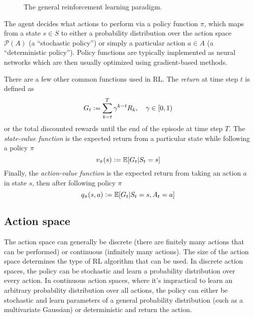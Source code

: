 \begin{figure}
    \centering
    \caption{The general reinforcement learning paradigm.}
    \label{fig:RL}
\end{figure}

The agent decides what actions to perform via a policy function $\pi$, which maps from a state $s \in S$ to either a probability distribution over the action space $\mathcal{P}(A)$ (a ``stochastic policy'') or simply a particular action $a \in A$ (a ``deterministic policy''). Policy functions are typically implemented as neural networks which are then usually optimized using gradient-based methods.

There are a few other common functions used in RL. The \emph{return} at time step $t$ is defined as
\begin{equation}\label{eq:return}
    G_t \mathrel{\mathop:}= \sum_{k=t}^T \gamma^{k-t} R_k, \quad \gamma \in [0,1)
\end{equation}
or the total discounted rewards until the end of the episode at time step $T$. The \emph{state-value function} is the expected return from a particular state while following a policy $\pi$
\begin{equation}\label{eq:state_value}
    v_\pi(s) \mathrel{\mathop:}= \mathbb E[G_t | S_t = s]
\end{equation}
Finally, the \emph{action-value function} is the expected return from taking an action $a$ in state $s$, then after following policy $\pi$
\begin{equation}\label{eq:action_value}
    q_\pi(s, a) \mathrel{\mathop:}= \mathbb E[G_t | S_t = s, A_t = a]
\end{equation}

\subsection{Action space}

The action space can generally be discrete (there are finitely many actions that can be performed) or continuous  (infinitely many actions). The size of the action space determines the type of RL algorithm that can be used. In discrete action spaces, the policy can be stochastic and learn a probability distribution over every action. In continuous action spaces, where it's impractical to learn an arbitrary probability distribution over all actions, the policy can either be stochastic and learn parameters of a general probability distribution (such as a multivariate Gaussian) or deterministic and return the action.

